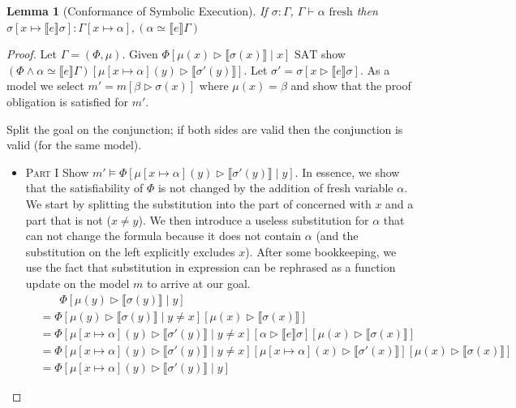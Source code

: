 \documentclass[twoside, english, final]{sdqthesis}
\newcommand{\bbracket}[1]{\llbracket #1 \rrbracket}
\newcommand{\tr}[0]{\triangleright}
\newtheorem{lemma}[theorem]{Lemma}
\theoremstyle{definition}
\begin{document}
\begin{lemma}[Conformance of Symbolic Execution]\label{lem:conf-sym-exec}
  If \hyperref[def:state-conformance]{$\sigma : \Gamma$}, $\Gamma \vdash \alpha \text{ fresh}$ then $\sigma[x \mapsto \bbracket{e} \sigma] : \Gamma[x \mapsto \alpha],(\alpha \simeq \bbracket{e} \Gamma)$
\end{lemma}
\begin{proof}
  Let $\Gamma = (\Phi, \mu)$. Given $\Phi[ \mu(x) \tr \bbracket{\sigma(x)} \mid x] \text{ SAT}$  show
  $(\Phi \wedge \alpha \simeq \bbracket{e}\Gamma)[\mu[x \mapsto \alpha](y) \tr \bbracket{\sigma'(y)}]$.
  Let $\sigma' = \sigma[x \tr \bbracket{e} \sigma]$.
  As a model we select $m' = m[\beta \tr \sigma(x)]$ where $\mu(x) = \beta$ and show that the proof obligation is satisfied for $m'$.
  
  Split the goal on the conjunction; if both sides are valid then the conjunction is valid (for the same model).
  \begin{itemize}
    \item \textsc{Part I} Show $m' \vDash \Phi[\mu[x \mapsto \alpha](y) \tr \bbracket{\sigma'(y)} \mid y]$.
      In essence, we show that the satisfiability of $\Phi$ is not changed by the addition of fresh variable $\alpha$. We start by splitting the substitution into the part of concerned with $x$ and a part that is not ($x \neq y$). We then introduce a useless substitution for $\alpha$ that can not change the formula because it does not contain $\alpha$ (and the substitution on the left explicitly excludes $x$). After some bookkeeping, we use the fact that substitution in expression can be rephrased as a function update on the model $m$ to arrive at our goal.
      \begin{align*}
          &\phantom{=}\ \ \Phi[\mu(y) \tr \bbracket{\sigma(y)} \mid y]
          \\   &= \Phi[\mu(y) \tr \bbracket{\sigma(y)} \mid y \neq x][\mu(x) \tr \bbracket{\sigma(x)}]
          \\ &= \Phi
            [\mu[x \mapsto \alpha](y) \tr \bbracket{\sigma'(y)} \mid y \neq x]
            [\alpha \tr \bbracket{e} \sigma]
            [\mu(x) \tr \bbracket{\sigma(x)}]
          \\ &= \Phi
            [\mu[x \mapsto \alpha](y) \tr \bbracket{\sigma'(y)} \mid y \neq x]
            [\mu[x\mapsto \alpha](x) \tr \bbracket{\sigma'(x)}]
            [\mu(x) \tr \bbracket{\sigma(x)}]
          \\ &= \Phi
            [\mu[x \mapsto \alpha](y) \tr \bbracket{\sigma'(y)} \mid y]

\end{align*}
\end{itemize}
\end{proof}
\end{document}
